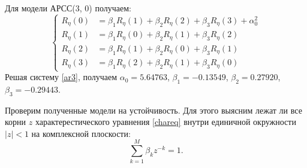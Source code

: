 \documentclass[12pt, fleqn]{article}
\begin{document}
{{		Для модели АРСС(3, 0) получаем:
		\begin{equation}\label{ar3}
			\left\{
			\begin{split}
				R_{\eta}(0) &= \beta_1 R_{\eta}(1) + \beta_2 R_{\eta}(2) + \beta_3 R_{\eta}(3) + \alpha^2_0 \\
				R_{\eta}(1) &= \beta_1 R_{\eta}(0) + \beta_2 R_{\eta}(1) + \beta_3 R_{\eta}(2) \\
				R_{\eta}(2) &= \beta_1 R_{\eta}(1) + \beta_2 R_{\eta}(0) + \beta_3 R_{\eta}(1) \\
				R_{\eta}(3) &= \beta_1 R_{\eta}(2) + \beta_2 R_{\eta}(1) + \beta_3 R_{\eta}(0)
			\end{split}
			\right.
		\end{equation}
		Решая систему \eqref{ar3}, получаем $\alpha_0 = 5.64763$, $\beta_1 = -0.13549$, $\beta_2 = 0.27920$, $\beta_3 = -0.29443$.\medskip 
										      
		Проверим полученные модели на устойчивость. Для этого выясним лежат ли все корни $z$ характерестического уравнения \eqref{chareq} внутри единичной окружности $ \left| z \right| < 1 $ на комплексной плоскости:
		\begin{equation}\label{chareq}
			\sum_{k=1}^M {\beta_k z^{-k}} = 1.
		\end{equation}\medskip 
										      

}}
\end{document}
